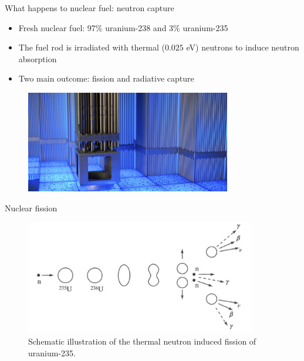 \documentclass[10pt]{beamer}
\begin{document}
\begin{frame}{What happens to nuclear fuel: neutron capture}
\begin{itemize}[<+->]
\item Fresh nuclear fuel: 97\% uranium-238 and 3\% uranium-235
\item The fuel rod is irradiated with \alert{thermal ($0.025$ eV)} neutrons to induce neutron absorption
\item Two main outcome: fission and radiative capture
\end{itemize}
\begin{figure}
\centering
\includegraphics[width=0.8\textwidth]{rod}
\end{figure}
\end{frame}

\begin{frame}{Nuclear fission}
\begin{figure}
\centering
\includegraphics[width=0.9\textwidth]{fission}
\caption*{Schematic illustration of the thermal neutron induced fission of uranium-235. \cite{l01}}
\end{figure}

\end{frame}
\end{document}
